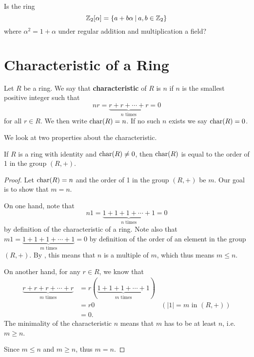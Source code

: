 \begin{exercise}\label{exercise-Zn2[alpha]}
    Is the ring
    \[
        \Zn{2}[\alpha] = \{a+b\alpha \vert a,b\in\Zn{2}\}
    \]
    where $\alpha^2 = 1 + \alpha$ under regular addition and multiplication a field?
\end{exercise}

\section{Characteristic of a Ring}
\begin{definition}
    Let $R$ be a ring. We say that \textbf{characteristic} of $R$ is $n$ if $n$ is the smallest positive integer such that
    \[
        nr = \underbrace{r+r+\cdots+r}_{n \text{ times}} = 0
    \]
    for all $r \in R$. We then write $\mathrm{char}(R) = n$. If no such $n$ exists we say $\mathrm{char}(R) = 0$.
\end{definition}

We look at two properties about the characteristic.
\begin{proposition}
    If $R$ is a ring with identity and $\mathrm{char}(R) \neq 0$, then $\mathrm{char}(R)$ is equal to the order of 1 in the group $(R, +)$.
\end{proposition}
\begin{proof}
    Let $\mathrm{char}(R) = n$ and the order of 1 in the group $(R, +)$ be $m$. Our goal is to show that $m = n$.

    On one hand, note that
    \[
        n1 = \underbrace{1+1+1+\cdots+1}_{n \text{ times}} = 0
    \]
    by definition of the characteristic of a ring. Note also that $m1 = \underbrace{1+1+1+\cdots+1}_{m \text{ times}} = 0$ by definition of the order of an element in the group $(R, +)$. By , this means that $n$ is a multiple of $m$, which thus means $m \leq n$.

    On another hand, for any $r \in R$, we know that
    \begin{align*}
        \underbrace{r + r + r + \cdots + r}_{m \text{ times}} &= r(\underbrace{1+1+1+\cdots+1}_{m \text{ times}})\\
        &= r0 & (|1| = m \text{ in } (R,+))\\
        &= 0.
    \end{align*}
    The minimality of the characteristic $n$ means that $m$ has to be at least $n$, i.e. $m \geq n$.

    Since $m \leq n$ and $m \geq n$, thus $m = n$.
\end{proof}

